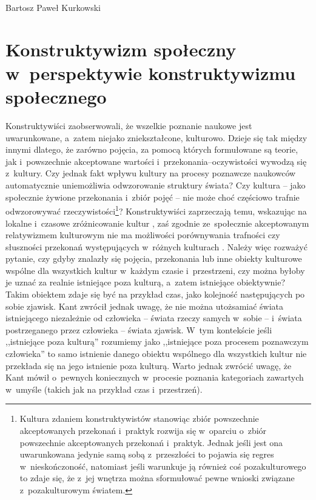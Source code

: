 \begin{artplenv}{Bartosz Paweł Kurkowski}
\section{Konstruktywizm społeczny w~perspektywie konstruktywizmu społecznego}

Konstruktywiści zaobserwowali, że wszelkie poznanie naukowe jest uwarunkowane, a~zatem niejako zniekształcone,
kulturowo. Dzieje się tak między innymi dlatego, że zarówno pojęcia, za pomocą których formułowane są teorie,
jak i~powszechnie akceptowane wartości i~przekonania–oczywistości wywodzą się z~kultury. Czy jednak fakt wpływu kultury na
procesy poznawcze naukowców automatycznie uniemożliwia odwzorowanie struktury świata? Czy kultura -- jako społecznie
żywione przekonania i~zbiór pojęć -- nie może choć częściowo trafnie odwzorowywać rzeczywistości\footnote{Kultura
zdaniem konstruktywistów stanowiąc zbiór powszechnie akceptowanych przekonań i~praktyk rozwija się w~oparciu o~zbiór
powszechnie akceptowanych przekonań i~praktyk. Jednak jeśli jest ona uwarunkowana jedynie samą sobą z~przeszłości to
pojawia się regres w~nieskończoność, natomiast jeśli warunkuje ją również coś pozakulturowego to zdaje się, że z~jej
wnętrza można sformułować pewne wnioski związane z~pozakulturowym światem.}? Konstruktywiści zaprzeczają temu,
wskazując na lokalne i~czasowe zróżnicowanie kultur
\parencite[s.~33]{zboron_teorie_2009},
zaś zgodnie
ze~społecznie akceptowanym relatywizmem kulturowym nie ma możliwości porównywania trafności czy słuszności przekonań
występujących w~różnych kulturach
\parencite[s.~76]{przymenski_socjologia:_2008}.
Należy więc rozważyć pytanie, czy
gdyby znalazły się pojęcia, przekonania lub inne obiekty kulturowe wspólne dla wszystkich kultur w~każdym
czasie i~przestrzeni, czy można byłoby je uznać za realnie istniejące poza kulturą, a~zatem istniejące obiektywnie? Takim
obiektem zdaje się być na przykład czas, jako kolejność następujących po sobie zjawisk. Kant zwrócił jednak uwagę, że
nie można utożsamiać świata istniejącego niezależnie od człowieka -- świata rzeczy samych w~sobie -- i~świata
postrzeganego przez człowieka -- świata zjawisk. W~tym kontekście jeśli ,,istniejące poza kulturą'' rozumiemy jako
,,istniejące poza procesem poznawczym człowieka'' to samo istnienie danego obiektu wspólnego dla wszystkich kultur nie
przekłada się na jego istnienie poza kulturą. Warto jednak zwrócić uwagę, że Kant mówił o~pewnych
koniecznych w~procesie poznania kategoriach zawartych w~umyśle (takich jak na przykład czas i~przestrzeń).

\end{artplenv}
